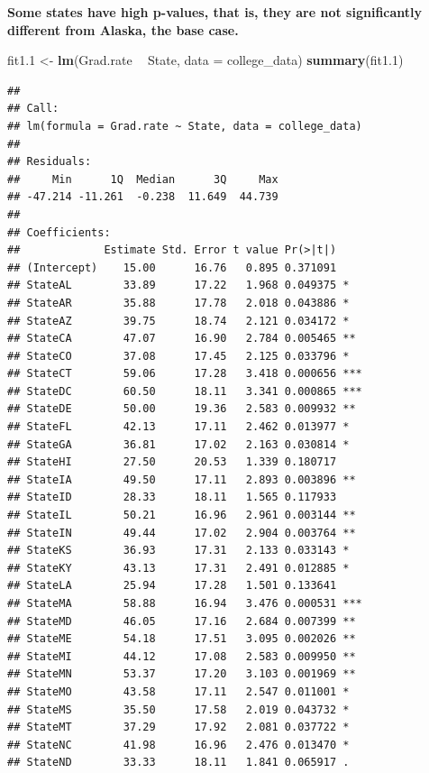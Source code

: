 \documentclass[]{article}
\newenvironment{Shaded}{\begin{snugshade}}{\end{snugshade}}
\newcommand{\KeywordTok}[1]{\textcolor[rgb]{0.13,0.29,0.53}{\textbf{#1}}}
\newcommand{\DataTypeTok}[1]{\textcolor[rgb]{0.13,0.29,0.53}{#1}}
\newcommand{\DecValTok}[1]{\textcolor[rgb]{0.00,0.00,0.81}{#1}}
\newcommand{\StringTok}[1]{\textcolor[rgb]{0.31,0.60,0.02}{#1}}
\newcommand{\OperatorTok}[1]{\textcolor[rgb]{0.81,0.36,0.00}{\textbf{#1}}}
\newcommand{\NormalTok}[1]{#1}
\begin{document}
\textbf{Some states have high p-values, that is, they are not
significantly different from Alaska, the base case.}

\begin{Shaded}
\begin{Highlighting}[]
\NormalTok{fit1.}\DecValTok{1}\NormalTok{ <-}\StringTok{ }\KeywordTok{lm}\NormalTok{(Grad.rate }\OperatorTok{~}\StringTok{ }\NormalTok{State, }\DataTypeTok{data =}\NormalTok{ college_data)}
\KeywordTok{summary}\NormalTok{(fit1.}\DecValTok{1}\NormalTok{)}
\end{Highlighting}
\end{Shaded}

\begin{verbatim}
## 
## Call:
## lm(formula = Grad.rate ~ State, data = college_data)
## 
## Residuals:
##     Min      1Q  Median      3Q     Max 
## -47.214 -11.261  -0.238  11.649  44.739 
## 
## Coefficients:
##             Estimate Std. Error t value Pr(>|t|)    
## (Intercept)    15.00      16.76   0.895 0.371091    
## StateAL        33.89      17.22   1.968 0.049375 *  
## StateAR        35.88      17.78   2.018 0.043886 *  
## StateAZ        39.75      18.74   2.121 0.034172 *  
## StateCA        47.07      16.90   2.784 0.005465 ** 
## StateCO        37.08      17.45   2.125 0.033796 *  
## StateCT        59.06      17.28   3.418 0.000656 ***
## StateDC        60.50      18.11   3.341 0.000865 ***
## StateDE        50.00      19.36   2.583 0.009932 ** 
## StateFL        42.13      17.11   2.462 0.013977 *  
## StateGA        36.81      17.02   2.163 0.030814 *  
## StateHI        27.50      20.53   1.339 0.180717    
## StateIA        49.50      17.11   2.893 0.003896 ** 
## StateID        28.33      18.11   1.565 0.117933    
## StateIL        50.21      16.96   2.961 0.003144 ** 
## StateIN        49.44      17.02   2.904 0.003764 ** 
## StateKS        36.93      17.31   2.133 0.033143 *  
## StateKY        43.13      17.31   2.491 0.012885 *  
## StateLA        25.94      17.28   1.501 0.133641    
## StateMA        58.88      16.94   3.476 0.000531 ***
## StateMD        46.05      17.16   2.684 0.007399 ** 
## StateME        54.18      17.51   3.095 0.002026 ** 
## StateMI        44.12      17.08   2.583 0.009950 ** 
## StateMN        53.37      17.20   3.103 0.001969 ** 
## StateMO        43.58      17.11   2.547 0.011001 *  
## StateMS        35.50      17.58   2.019 0.043732 *  
## StateMT        37.29      17.92   2.081 0.037722 *  
## StateNC        41.98      16.96   2.476 0.013470 *  
## StateND        33.33      18.11   1.841 0.065917 .  

\end{verbatim}
\end{document}
